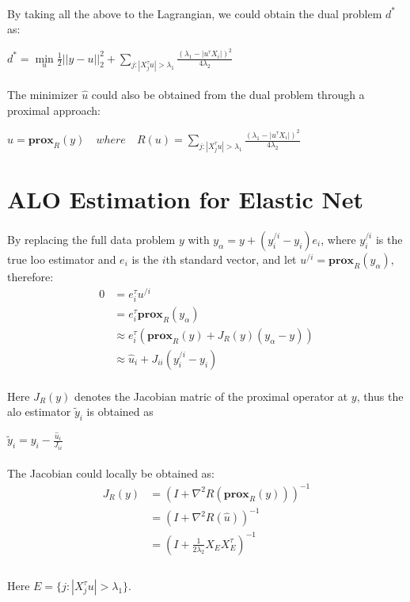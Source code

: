 \documentclass{article}
\begin{document}
\paragraph{}By taking all the above to the Lagrangian, we could obtain the dual problem $d^{*}$ as:
\begin{center}
$d^{*} = \min\limits_{u} \frac{1}{2}||y-u||_{2}^{2} + \sum\limits_{j: |X_{j}^{\tau}u| > \lambda_{1}}\frac{(\lambda_{1}-|u^{\tau}X_{i}|)^{2}}{4\lambda_{2}}$
\end{center}
\paragraph{}The minimizer $\hat{u}$ could also be obtained from the dual problem through a proximal approach:
\begin{center}
$\hat{u} = \textbf{prox}_{R}(y) \quad where \quad R(u) = \sum\limits_{j: |X_{j}^{\tau}u| > \lambda_{1}}\frac{(\lambda_{1}-|u^{\tau}X_{i}|)^{2}}{4\lambda_{2}}$
\end{center}
\section{ALO Estimation for Elastic Net}
\paragraph{}By replacing the full data problem $y$ with $y_{\alpha} = y + (y_{i}^{/i}-y_{i})e_{i}$, where $y_{i}^{/i}$ is the true loo estimator and $e_{i}$ is the $i$th standard vector, and let $u^{/i} = \textbf{prox}_{R}(y_{\alpha})$, therefore:
\begin{align*}
0 &= e_{i}^{\tau}u^{/i}\\
& = e_{i}^{\tau}\textbf{prox}_{R}(y_{\alpha})\\
& \approx e_{i}^{\tau}(\textbf{prox}_{R}(y)+J_{R}(y)(y_{\alpha}-y))\\
& \approx \hat{u}_{i} + J_{ii}(y_{i}^{/i}-y_{i})
\end{align*}
\paragraph{}Here $J_{R}(y)$ denotes the Jacobian matric of the proximal operator at $y$, thus the alo estimator $\tilde{y}_{i}$ is obtained as 
\begin{center}
$\tilde{y}_{i} = y_{i} - \frac{\hat{u}_{i}}{J_{ii}}$
\end{center}
\paragraph{}The Jacobian could locally be obtained as:
\begin{align*}
J_{R}(y) &= (I+\nabla^{2}R(\textbf{prox}_{R}(y)))^{-1}\\
&= (I + \nabla^{2}R(\hat{u}))^{-1}\\
&= (I + \frac{1}{2\lambda_{2}}X_{E}X_{E}^{\tau})^{-1}\\
\end{align*}
\paragraph{}Here $E = \{j:|X_{j}^{\tau}u|>\lambda_{1}\}$.
\end{document}
